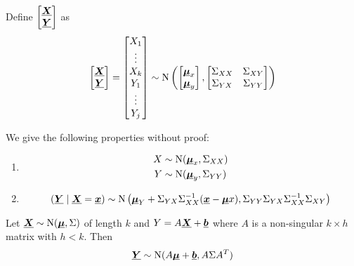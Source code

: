 \documentclass[12pt]{extarticle}
\newcommand{\Normal}{{\operatorfont N}}
\renewcommand{\vec}[1]{\uvec{#1}}
\begin{document}
\begin{proposition}
    \label{prop:multivariate:prop}
    Define $\begin{bmatrix} \vec X \\ \vec Y \end{bmatrix}$ as
    \begin{equation}
        \begin{bmatrix}
            \vec X \\ \vec Y
        \end{bmatrix}
        =
        \begin{bmatrix}
            X_1 \\ \vdots \\ X_k \\ Y_1 \\ \vdots\\ Y_j
        \end{bmatrix}
        \sim \Normal\left(
        \begin{bmatrix}
            \vec \mu_x \\ \vec \mu_y
        \end{bmatrix},
        \begin{bmatrix}
            \Sigma_{XX} & \Sigma_{XY} \\
            \Sigma_{YX} & \Sigma_{YY}
        \end{bmatrix}
        \right)
    \end{equation}

    We give the following properties without proof:
    \begin{enumerate}[label=\roman*.]
        \item \begin{align}
                  X & \sim \Normal(\vec \mu_x, \Sigma_{XX}) \\
                  Y & \sim \Normal(\vec \mu_y, \Sigma_{YY})
              \end{align}
        \item \begin{equation}
                  \left( \vec Y \mid \vec X = \vec x \right) \sim \Normal \left( \vec \mu_Y + \Sigma_{YX} \Sigma_{XX}^{-1}(\vec x - \vec \mu x), \Sigma_{YY} \Sigma_{YX} \Sigma_{XX}^{-1} \Sigma_{XY} \right)
              \end{equation}
    \end{enumerate}
\end{proposition}

\begin{proposition}
    Let $\vec X \sim \Normal(\vec \mu, \Sigma)$ of length $k$ and $Y = A \vec X + \vec b$ where $A$ is a non-singular $k \times h$ matrix with $h < k$.
    Then
    \begin{equation}
        \vec Y \sim \Normal(A \vec \mu + \vec b, A \Sigma A^T)
    \end{equation}
\end{proposition}
\end{document}
